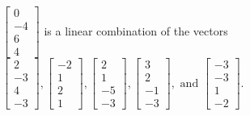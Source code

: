 \begin{exercise}
\begin{exerciseStatement}
  \end{exerciseStatement}
  \begin{exerciseAnswer}
   \(\left[\begin{array}{c}
0 \\
-4 \\
6 \\
4
\end{array}\right]\) 
  	 is  
	a linear combination of the vectors \(\left[\begin{array}{c}
2 \\
-3 \\
4 \\
-3
\end{array}\right] , \left[\begin{array}{c}
-2 \\
1 \\
2 \\
1
\end{array}\right] , \left[\begin{array}{c}
2 \\
1 \\
-5 \\
-3
\end{array}\right] , \left[\begin{array}{c}
3 \\
2 \\
-1 \\
-3
\end{array}\right] , \text{ and } \left[\begin{array}{c}
-3 \\
-3 \\
1 \\
-2
\end{array}\right]\).

	
  


  \end{exerciseAnswer}
\end{exercise}